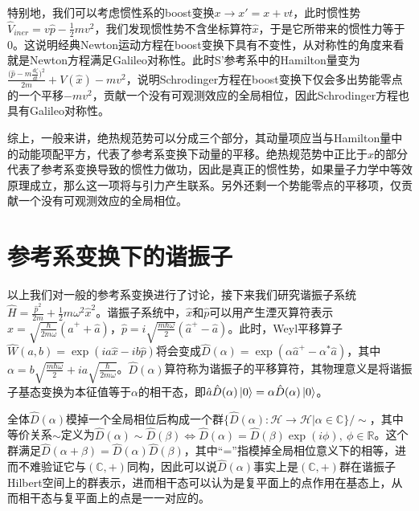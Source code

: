 \documentclass[a4paper]{article}
\begin{document}
        特别地，我们可以考虑惯性系的boost变换$x\rightarrow x'=x+vt$，此时惯性势$\hat{V}_{iner}=v\hat{p}-\frac{1}{2}mv^2$，我们发现惯性势不含坐标算符$\hat{x}$，于是它所带来的惯性力等于0。这说明经典Newton运动方程在boost变换下具有不变性，从对称性的角度来看就是Newton方程满足Galileo对称性。此时S'参考系中的Hamilton量变为$\frac{\big(\hat{p}-m\frac{d\zeta}{dt}\big)^2}{2m}+V(\hat{x})-mv^2$，说明Schrodinger方程在boost变换下仅会多出势能零点的一个平移$-mv^2$，贡献一个没有可观测效应的全局相位，因此Schrodinger方程也具有Galileo对称性。

        综上，一般来讲，绝热规范势可以分成三个部分，其动量项应当与Hamilton量中的动能项配平方，代表了参考系变换下动量的平移。绝热规范势中正比于$\hat{x}$的部分代表了参考系变换导致的惯性力做功，因此是真正的惯性势，如果量子力学中等效原理成立，那么这一项将与引力产生联系。另外还剩一个势能零点的平移项，仅贡献一个没有可观测效应的全局相位。

        


    \section{参考系变换下的谐振子}

        以上我们对一般的参考系变换进行了讨论，接下来我们研究谐振子系统$\hat{H}=\frac{\hat{p}^2}{2m}+\frac{1}{2}m\omega^2\hat{x}^2$。谐振子系统中，$\hat{x}$和$\hat{p}$可以用产生湮灭算符表示$\hat{x}=\sqrt{\frac{\hbar}{2m\omega}}(\hat{a}^{+}+\hat{a})$，$\hat{p}=i\sqrt{\frac{m\hbar\omega}{2}}(\hat{a}^{+}-\hat{a})$。此时，Weyl平移算子$\hat{W}(a, b)=\exp(ia\hat{x}-ib\hat{p})$将会变成$\hat{D}(\alpha)=\exp(\alpha\hat{a}^{+}-\alpha^*\hat{a})$，其中$\alpha=b\sqrt{\frac{m\hbar\omega}{2}}+ia\sqrt{\frac{\hbar}{2m\omega}}$。$\hat{D}(\alpha)$算符称为谐振子的平移算符，其物理意义是将谐振子基态变换为本征值等于$\alpha$的相干态，即$\hat{a}\hat{D}(\alpha)\ket{0}=\alpha\hat{D}(\alpha)\ket{0}$。

        全体$\hat{D}(\alpha)$模掉一个全局相位后构成一个群$\{\hat{D}(\alpha):\mathcal{H}\to\mathcal{H}|\alpha\in\mathbb{C}\}/\sim$，其中等价关系$\sim$定义为$\hat{D}(\alpha)\sim\hat{D}(\beta) \Leftrightarrow \hat{D}(\alpha)=\hat{D}(\beta)\exp(i\phi),\ \phi\in\mathbb{R}$。这个群满足$\hat{D}(\alpha+\beta)=\hat{D}(\alpha)\hat{D}(\beta)$，其中“=”指模掉全局相位意义下的相等，进而不难验证它与$(\mathbb{C},+)$同构，因此可以说$\hat{D}(\alpha)$事实上是$(\mathbb{C},+)$群在谐振子Hilbert空间上的群表示，进而相干态可以认为是复平面上的点作用在基态上，从而相干态与复平面上的点是一一对应的。
\end{document}
